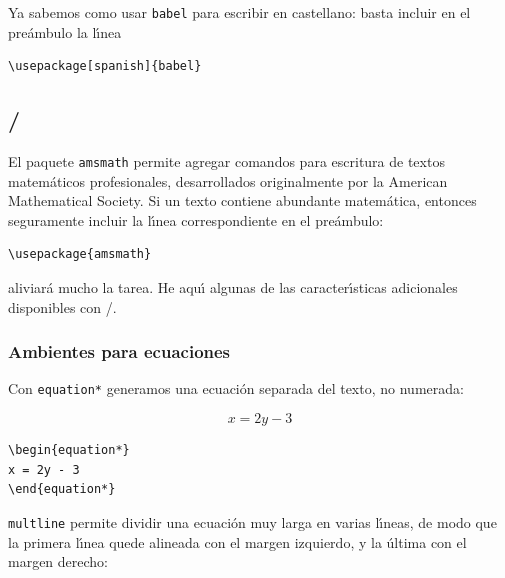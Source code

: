 {Ya
sabemos como usar {\tt babel} para escribir en castellano: basta
incluir en el pre\'ambulo la l\'{\i}nea

\begin{verbatim}
\usepackage[spanish]{babel}
\end{verbatim}

\subsection{\amslatex/}
\label{amsmath}

El paquete \verb+amsmath+ permite agregar comandos para escritura de
textos matem\'aticos profesionales, desarrollados originalmente por la
American Mathematical Society. Si un texto contiene abundante
matem\'atica, entonces seguramente incluir la l\'{\i}nea 
correspondiente en el pre\'ambulo:
\begin{verbatim}
\usepackage{amsmath}
\end{verbatim}
aliviar\'a mucho la tarea. He aqu\'{\i} algunas de las
caracter\'{\i}sticas adicionales disponibles con \amslatex/.

\subsubsection{Ambientes para ecuaciones}

Con \verb+equation*+ generamos una ecuaci\'on separada del texto, no
numerada:

\vspace{.3cm}
{\small
\begin{minipage}[c]{5cm}
\begin{equation*}
x = 2y - 3
\end{equation*}
\end{minipage}
\hspace{2cm}
\begin{minipage}[t]{5cm}
\begin{verbatim}
\begin{equation*}
x = 2y - 3
\end{equation*}
\end{verbatim}
\end{minipage}
}
\vspace{.3cm}

\verb+multline+ permite dividir una ecuaci\'on muy larga en varias
l\'{\i}neas, de modo que la primera l\'{\i}nea quede alineada con el
margen izquierdo, y la \'ultima con el margen derecho:

}
